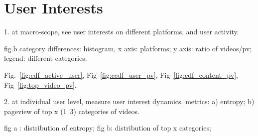 \section{User Interests}

1. at macro-scope, see user interests on different platforms, and user activity.


fig.b category differences: histogram, x axis: platforms; y axis:
ratio of videos/pv; legend: different categories.

Fig.~\ref{fig:cdf_active_user}, Fig~\ref{fig:ccdf_user_pv},
Fig~\ref{fig:cdf_content_pv}, Fig~\ref{fig:top_video_pv}. 

2. at individual user level, measure user interest dynamics. metrics:
a) entropy; b) pageview of top x (1~3) categories of videos.

fig a : distribution of entropy;
fig b: distribution of top x categories;


